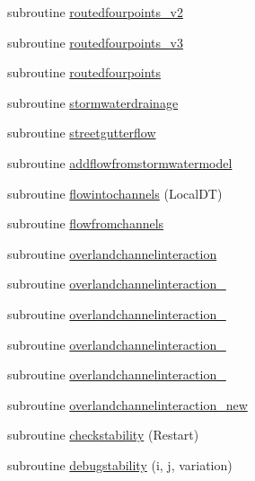 \begin{DoxyCompactItemize}
\item 
subroutine \mbox{\hyperlink{namespacemodulerunoff_aeedcf3916bc6da030fd004afb251262f}{routedfourpoints\+\_\+v2}}
\item 
subroutine \mbox{\hyperlink{namespacemodulerunoff_a7ca1b43ca23fdb3f25a304ec7ea33a92}{routedfourpoints\+\_\+v3}}
\item 
subroutine \mbox{\hyperlink{namespacemodulerunoff_a0a2296b090b1a35c74f3a4c0e35ad401}{routedfourpoints}}
\item 
subroutine \mbox{\hyperlink{namespacemodulerunoff_af4d68602fac4df4d58a06a8d87433a3b}{stormwaterdrainage}}
\item 
subroutine \mbox{\hyperlink{namespacemodulerunoff_a5cc041140596592ca2cd2f67dfadd9a7}{streetgutterflow}}
\item 
subroutine \mbox{\hyperlink{namespacemodulerunoff_abba7c93964c033b2908d8af2d841a8db}{addflowfromstormwatermodel}}
\item 
subroutine \mbox{\hyperlink{namespacemodulerunoff_a08312a51cf0c25b5c2019c42750e1673}{flowintochannels}} (Local\+DT)
\item 
subroutine \mbox{\hyperlink{namespacemodulerunoff_ad9add85fb1e5efe5eb239bb72e597945}{flowfromchannels}}
\item 
subroutine \mbox{\hyperlink{namespacemodulerunoff_a5181922fc72d5c17acb9fdf3127d6318}{overlandchannelinteraction}}
\item 
subroutine \mbox{\hyperlink{namespacemodulerunoff_a83d1f0b3f63668b07444f05e9e5bcf7c}{overlandchannelinteraction\+\_}}
\item 
subroutine \mbox{\hyperlink{namespacemodulerunoff_af059c1ee46f4d88ba5904020c0d1edfd}{overlandchannelinteraction\+\_}}
\item 
subroutine \mbox{\hyperlink{namespacemodulerunoff_add510de98548d322d9084c2782b07388}{overlandchannelinteraction\+\_}}
\item 
subroutine \mbox{\hyperlink{namespacemodulerunoff_a5389b89d2ccfe710976c31b556113eca}{overlandchannelinteraction\+\_}}
\item 
subroutine \mbox{\hyperlink{namespacemodulerunoff_a03f16d8e0cac2434944d8e8ac46db4c2}{overlandchannelinteraction\+\_\+new}}
\item 
subroutine \mbox{\hyperlink{namespacemodulerunoff_a330dcdf852e8d32ad8f61027fca5572d}{checkstability}} (Restart)
\item 
subroutine \mbox{\hyperlink{namespacemodulerunoff_ad470166654c51ff37fe83cafeef5a424}{debugstability}} (i, j, variation)
\item 

\end{DoxyCompactItemize}
